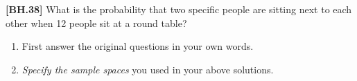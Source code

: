 \begin{exercise}\textbf{[BH.38]}
What is the probability that two specific people are sitting next to each other when 12 people sit at a round table? 
	\begin{enumerate}
		\item First answer the original questions in your own words.
		\item  \textit{Specify the sample spaces} you used in your above solutions. 
	\end{enumerate}
\end{exercise}

